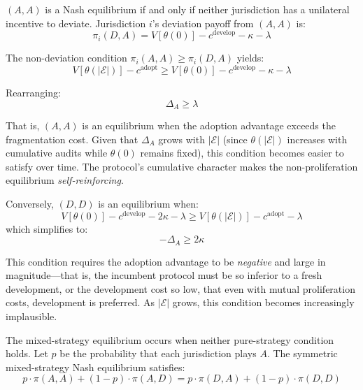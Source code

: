 \documentclass[12pt,a4paper]{article}
\theoremstyle{definition}
\theoremstyle{remark}
\begin{document}
$(A, A)$ is a Nash equilibrium if and only if neither jurisdiction has a unilateral incentive to deviate. Jurisdiction $i$'s deviation payoff from $(A, A)$ is:
\begin{equation}
\pi_i(D, A) = V[\theta(0)] - c^{\text{develop}} - \kappa - \lambda
\end{equation}

The non-deviation condition $\pi_i(A, A) \geq \pi_i(D, A)$ yields:
\begin{equation}
V[\theta(|\mathcal{E}|)] - c^{\text{adopt}} \geq V[\theta(0)] - c^{\text{develop}} - \kappa - \lambda
\end{equation}

Rearranging:
\begin{equation}
\Delta_A \geq \lambda
\end{equation}

That is, $(A, A)$ is an equilibrium when the adoption advantage exceeds the fragmentation cost. Given that $\Delta_A$ grows with $|\mathcal{E}|$ (since $\theta(|\mathcal{E}|)$ increases with cumulative audits while $\theta(0)$ remains fixed), this condition becomes easier to satisfy over time. The protocol's cumulative character makes the non-proliferation equilibrium \textit{self-reinforcing}.

Conversely, $(D, D)$ is an equilibrium when:
\begin{equation}
V[\theta(0)] - c^{\text{develop}} - 2\kappa - \lambda \geq V[\theta(|\mathcal{E}|)] - c^{\text{adopt}} - \lambda
\end{equation}
which simplifies to:
\begin{equation}
-\Delta_A \geq 2\kappa
\end{equation}

This condition requires the adoption advantage to be \textit{negative} and large in magnitude—that is, the incumbent protocol must be so inferior to a fresh development, or the development cost so low, that even with mutual proliferation costs, development is preferred. As $|\mathcal{E}|$ grows, this condition becomes increasingly implausible.

The mixed-strategy equilibrium occurs when neither pure-strategy condition holds. Let $p$ be the probability that each jurisdiction plays $A$. The symmetric mixed-strategy Nash equilibrium satisfies:
\begin{equation}
p \cdot \pi(A, A) + (1-p) \cdot \pi(A, D) = p \cdot \pi(D, A) + (1-p) \cdot \pi(D, D)
\end{equation}
\end{document}
